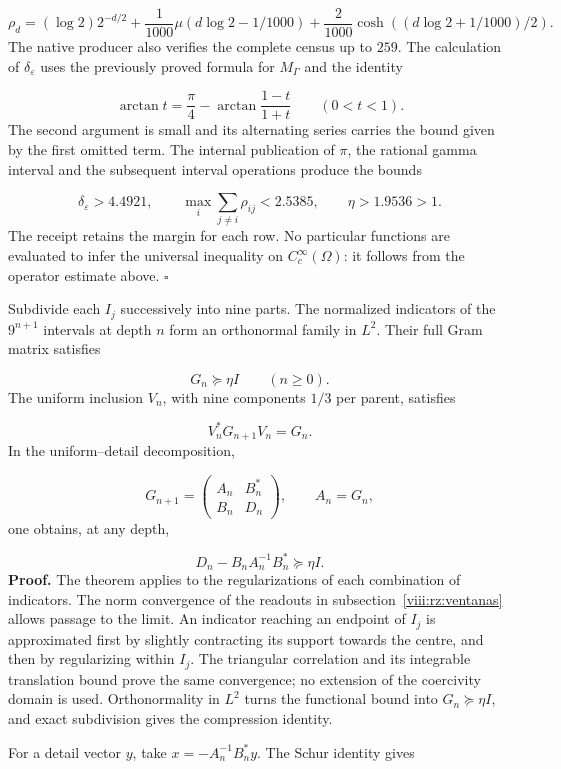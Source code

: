 \[
\rho_d=(\log2)2^{-d/2}
+\frac1{1000}\mu(d\log2-1/1000)
+\frac2{1000}\cosh((d\log2+1/1000)/2).
\]
The native producer also verifies the complete census up to \(259\). The calculation of \(\delta_\varepsilon\) uses the previously proved formula for \(M_\Gamma\) and the identity

\[
\arctan t=\frac\pi4-
\arctan\frac{1-t}{1+t}\qquad(0<t<1).
\]
The second argument is small and its alternating series carries the bound given by the first omitted term. The internal publication of \(\pi\), the rational gamma interval and the subsequent interval operations produce the bounds

\[
\delta_\varepsilon>4.4921,\qquad
\max_i\sum_{j\neq i}\rho_{ij}<2.5385,\qquad
\eta>1.9536>1.
\]
The receipt retains the margin for each row. No particular functions are evaluated to infer the universal inequality on \(C_c^\infty(\Omega)\): it follows from the operator estimate above. \hfill\(\square\)

Subdivide each \(I_j\) successively into nine parts. The normalized indicators of the \(9^{n+1}\) intervals at depth \(n\) form an orthonormal family in \(L^2\). Their full Gram matrix satisfies

\[
G_n\succeq\eta I\qquad(n\geq0).
\]
The uniform inclusion \(V_n\), with nine components \(1/3\) per parent, satisfies

\[
V_n^*G_{n+1}V_n=G_n.
\]
In the uniform–detail decomposition,

\[
G_{n+1}=\begin{pmatrix}A_n&B_n^*\\B_n&D_n\end{pmatrix},
\qquad A_n=G_n,
\]
one obtains, at any depth,

\[
\boxed{D_n-B_nA_n^{-1}B_n^*\succeq\eta I.}
\]
\textbf{Proof.} The theorem applies to the regularizations of each combination of indicators. The norm convergence of the readouts in subsection~\ref{viii:rz:ventanas} allows passage to the limit. An indicator reaching an endpoint of \(I_j\) is approximated first by slightly contracting its support towards the centre, and then by regularizing within \(I_j\). The triangular correlation and its integrable translation bound prove the same convergence; no extension of the coercivity domain is used. Orthonormality in \(L^2\) turns the functional bound into \(G_n\succeq\eta I\), and exact subdivision gives the compression identity.

For a detail vector \(y\), take \(x=-A_n^{-1}B_n^*y\). The Schur identity gives

